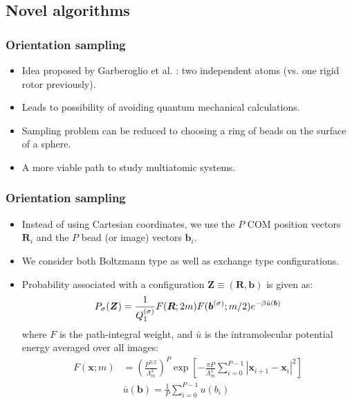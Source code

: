\documentclass[xcolor=svgnames]{beamer}
\DeclareRobustCommand{\mbf}[1]{{\boldsymbol {#1}}}
\begin{document}
        \subsection{Novel algorithms}
        \begin{frame}
            \frametitle{Orientation sampling}
            \begin{itemize}
                \item Idea proposed by Garberoglio et al. : two independent atoms (vs. one rigid rotor previously).
                \item Leads to possibility of avoiding quantum mechanical calculations.
                \item Sampling problem can be reduced to choosing a ring of beads on the surface of a sphere.
                \item A more viable path to study multiatomic systems.
            \end{itemize}
        \end{frame}
        \iffalse
        \begin{frame}
            \frametitle{Orientation sampling}
            \begin{itemize}
                \item Instead of using Cartesian coordinates, we use the $P$ COM position vectors $\mbf{R}_i$ and the $P$ bead (or image) vectors $\mbf{b}_i$.
                \item We consider both Boltzmann type as well as exchange type configurations.
                \item Probability associated with a configuration $\mbf{Z} \equiv (\mbf{R},\mbf{b})$ is given as:
                \begin{equation*}
                \label{eq:PIProb}
                    P_\sigma (\mbf{Z}) = \frac{1}{Q_1^{{\rm (\sigma)}}} F(\mbf{R};2m) F(\mbf{b}^{(\sigma)};m/2) e^{ - \beta \bar u(\mbf{b})}
                \end{equation*}
                where $F$ is the path-integral weight, and $\bar u$ is the intramolecular potential energy averaged over all images:
                \begin{equation*}
                    \begin{aligned}
                        F(\mbf{x};m) &= \left( \frac{P^{3/2}} {\Lambda _m^3} \right)^P \exp \left[ - \frac{\pi P}{\Lambda _m^2}\sum\limits_{i = 0}^{P-1} \left| \mbf{x}_{i + 1} - \mbf{x}_i \right|^2 \right]\\
                        &\bar u(\mbf{b}) = \frac{1}{P}\sum\limits_{i=0}^{P-1} {u\left(b_i \right)}
                    \end{aligned}
                \end{equation*}
            \end{itemize}
        \end{frame}
\end{document}
